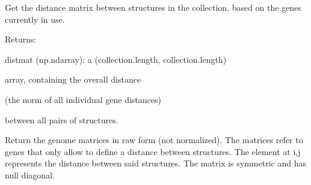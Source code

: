 \documentclass[letterpaper,10pt,english]{sphinxmanual}
\begin{document}
\begin{fulllineitems}
\begin{fulllineitems}
\end{fulllineitems}


\begin{fulllineitems}
\label{doctree/soprano.analyse.phylogen.phylogenclust:soprano.analyse.phylogen.phylogenclust.PhylogenCluster.get_distmat}
Get the distance matrix between structures in the collection,
based on the genes currently in use.

\begin{DUlineblock}{0em}
\item[] Returns:
\item[]
\begin{DUlineblock}{\DUlineblockindent}
\item[] distmat (np.ndarray): a (collection.length, collection.length)
\item[]
\begin{DUlineblock}{\DUlineblockindent}
\item[] array, containing the overall distance
\item[] (the norm of all individual gene distances)
\item[] between all pairs of structures.
\end{DUlineblock}
\end{DUlineblock}
\end{DUlineblock}

\end{fulllineitems}


\begin{fulllineitems}
\label{doctree/soprano.analyse.phylogen.phylogenclust:soprano.analyse.phylogen.phylogenclust.PhylogenCluster.get_genome_matrices}
Return the genome matrices in raw form (not normalized).
The matrices refer to genes that only allow to define a distance
between structures. The element at i,j represents the distance
between said structures. The matrix is symmetric and has
null diagonal.


\end{fulllineitems}
\end{fulllineitems}
\end{document}
